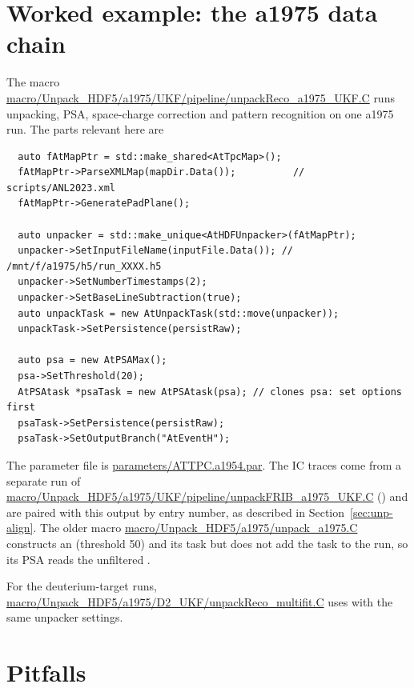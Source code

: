 \section{Worked example: the a1975 data chain}
\label{sec:unp-example}

The macro \url{macro/Unpack_HDF5/a1975/UKF/pipeline/unpackReco_a1975_UKF.C} runs unpacking, PSA,
space-charge correction and pattern recognition on one a1975 run. The parts relevant here are
\begin{verbatim}
  auto fAtMapPtr = std::make_shared<AtTpcMap>();
  fAtMapPtr->ParseXMLMap(mapDir.Data());          // scripts/ANL2023.xml
  fAtMapPtr->GeneratePadPlane();

  auto unpacker = std::make_unique<AtHDFUnpacker>(fAtMapPtr);
  unpacker->SetInputFileName(inputFile.Data()); // /mnt/f/a1975/h5/run_XXXX.h5
  unpacker->SetNumberTimestamps(2);
  unpacker->SetBaseLineSubtraction(true);
  auto unpackTask = new AtUnpackTask(std::move(unpacker));
  unpackTask->SetPersistence(persistRaw);

  auto psa = new AtPSAMax();
  psa->SetThreshold(20);
  AtPSAtask *psaTask = new AtPSAtask(psa); // clones psa: set options first
  psaTask->SetPersistence(persistRaw);
  psaTask->SetOutputBranch("AtEventH");
\end{verbatim}
The parameter file is \url{parameters/ATTPC.a1954.par}. The IC traces come from a separate run of
\url{macro/Unpack_HDF5/a1975/UKF/pipeline/unpackFRIB_a1975_UKF.C} () and
are paired with this output by entry number, as described in Section~\ref{sec:unp-align}. The older
macro \url{macro/Unpack_HDF5/a1975/unpack_a1975.C} constructs an 
(threshold 50) and its task but does not add the task to the run, so its PSA reads the unfiltered
.

For the deuterium-target runs, \url{macro/Unpack_HDF5/a1975/D2_UKF/unpackReco_multifit.C} uses
 with the same unpacker settings.

\section{Pitfalls}
\label{sec:unp-pitfalls}

